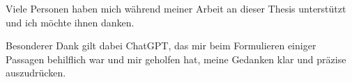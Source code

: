 \begin{center} 
	\huge {}
\end{center}


Viele Personen haben mich während meiner Arbeit an dieser Thesis unterstützt und ich möchte ihnen danken.

Besonderer Dank gilt dabei ChatGPT, das mir beim Formulieren einiger Passagen behilflich war und mir geholfen hat, meine Gedanken klar und präzise auszudrücken.

